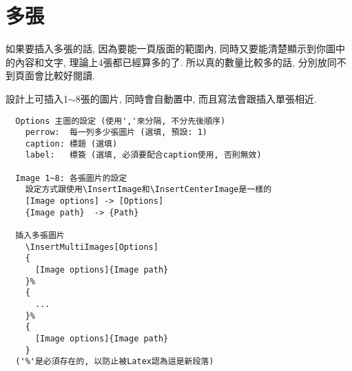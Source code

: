 
\newpage
\section{多張}

  如果要插入多張的話, 因為要能一頁版面的範圍內, 同時又要能清楚顯示到你圖中的內容和文字, 理論上4張都已經算多的了. 所以真的數量比較多的話, 分別放同不到頁面會比較好閱讀.

  設計上可插入1$\sim$8張的圖片, 同時會自動置中, 而且寫法會跟插入單張相近.

  \begin{framed}
  \begin{verbatim}
  Options 主圖的設定 (使用','來分隔, 不分先後順序)
    perrow:  每一列多少張圖片 (選填, 預設: 1)
    caption: 標題 (選填)
    label:   標簽 (選填, 必須要配合caption使用, 否則無效)

  Image 1~8: 各張圖片的設定
    設定方式跟使用\InsertImage和\InsertCenterImage是一樣的
    [Image options] -> [Options]
    {Image path}  -> {Path}

  插入多張圖片
    \InsertMultiImages[Options]
    {
      [Image options]{Image path}
    }%
    {
      ...
    }%
    {
      [Image options]{Image path}
    }
  ('%'是必須存在的, 以防止被Latex認為這是新段落)
  \end{verbatim}
  \end{framed}

